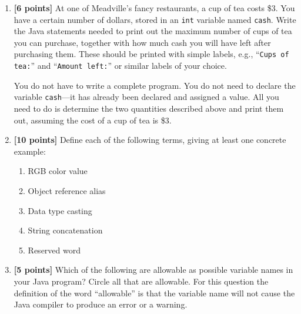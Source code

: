 \documentclass[11pt]{report}
\begin{document}
\begin{enumerate}
\vspace{2in}
\newpage

\item {\bf [6 points]}
At one of Meadville's fancy restaurants, a cup of tea costs
\$3. You have a certain number of dollars, stored in an {\tt int}
variable named {\tt cash}. Write the Java statements needed to
print out the maximum number of cups of tea you can purchase,
together with how much cash you will have left after purchasing them.
These should be printed with simple labels, e.g., ``{\tt Cups of tea:}'' 
and ``{\tt Amount left:}'' or similar labels of your choice.

You do not have to write a complete program. You do not need to declare
the variable {\tt cash}---it has already been declared and assigned a
value. All you need to do is determine the two quantities described
above and print them out,
assuming the cost of a cup of tea is \$3.

\vspace{3in}

\item {\bf [10 points]}
Define each of the following terms, giving at least one concrete example:
\begin{enumerate}
\item RGB color value 

\bigskip
\bigskip
\bigskip
\item Object reference alias

\bigskip
\bigskip
\bigskip

\item Data type casting

\bigskip
\bigskip
\bigskip

\item String concatenation 
\bigskip
\bigskip
\bigskip

\item Reserved word 
\bigskip
\bigskip
\bigskip

\end{enumerate}

\item {\bf [5 points]}
Which of the following are allowable as possible variable names in your Java program? Circle all that are allowable.
For this question the definition of the word ``allowable'' is that the variable name will not cause the Java compiler to produce an
error or a warning.


\end{enumerate}
\end{document}
